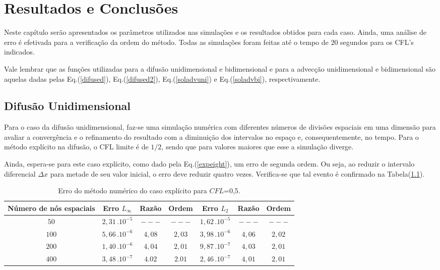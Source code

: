 \chapter{Resultados e Conclusões}
\noindent

	Neste capítulo serão apresentados os parâmetros utilizados nas simulações e os resultados obtidos para cada caso. Ainda, uma análise de erro é efetivada para a verificação da ordem do método. Todas as simulações foram feitas até o tempo de $20$ segundos para os CFL's indicados.
	
	Vale lembrar que as funções utilizadas para a difusão unidimensional e bidimensional e para a advecção unidimensional e bidimensional são aquelas dadas pelas Eq.(\ref{difused}), Eq.(\ref{difused2}), Eq.(\ref{soladvuni}) e Eq.(\ref{soladvbi}), respectivamente.
		
\section{Difusão Unidimensional}
\noindent

	Para o caso da difusão unidimensional, faz-se uma simulação numérica com diferentes números de divisões espaciais em uma dimensão para avaliar a convergência e o refinamento do resultado com a diminuição dos intervalos no espaço e, consequentemente, no tempo. Para o método explícito na difusão, o CFL limite é de $1/2$, sendo que para valores maiores que esse a simulação diverge.
	
	Ainda, espera-se para este caso explícito, como dado pela Eq.(\ref{expeight}), um erro de segunda ordem. Ou seja, ao reduzir o intervalo diferencial $\Delta x$ para metade de seu valor inicial, o erro deve reduzir quatro vezes. Verifica-se que tal evento é confirmado na Tabela(\ref{tabela1}).

\begin{table}[h!]
	\caption{Erro do método numérico do caso explícito para $CFL$=0,5.}
	\label{tabela1}
	\centering
	\begin{tabular}{c | c c c | c c c}
		\hline
		Número de nós  espaciais&       Erro $L_\infty$       	& Razão   	 & Ordem   & Erro $L_{2}$ 				& Razão 	  & Ordem  \\ \hline
		$50$ 					&		$2,31 \, . 10^{-5}$     & $---$      & $---$   &       $1,62 \, . 10^{-5}$  & $---$       & $---$    \\ 
		$100$ 					&       $5,66 \, . 10^{-6}$     & $4,08$     & $2,03$  &       $3,98 \, . 10^{-6}$  & $4,06$      & $2,02$    \\ 
		$200$ 					&       $1,40 \, . 10^{-6}$     & $4,04$     & $2,01$  &       $9,87 \, . 10^{-7}$  & $4,03$      & $2,01$    \\ 
		$400$ 					&       $3,48 \, . 10^{-7}$     & $4.02$     & $2.01$  &       $2,46 \, . 10^{-7}$  & $4,01$      & $2,01$    \\ \hline
	\end{tabular}
\end{table}

